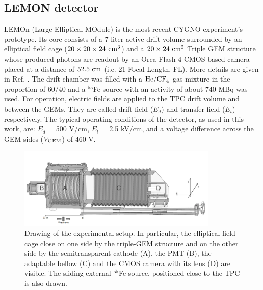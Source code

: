 \documentclass[a4paper,11pt]{article}
\begin{document}
\subsection{LEMON detector}

LEMOn (Large Elliptical MOdule) is the most recent CYGNO experiment's prototype. Its core consists of a 7 liter active drift volume surrounded by an elliptical field cage ($\rm 20 \times 20 \times 24~cm^3$) and a $\rm 20 \times 24~cm^2$ Triple GEM structure whose produced photons are readout by an Orca Flash 4 CMOS-based camera~\cite{ORCAcamera} placed at a distance of $\rm 52.5~cm$ (i.e. 21 Focal Length, FL). 
More details are given in Ref. \cite{bib:fe55, bib:eps, bib:ieee17}.
The drift chamber was filled with a $\rm He/CF_4$ gas mixture in the proportion of $60/40$
and a $^{55}$Fe source with an activity of about 740 MBq was used.
For operation, electric fields are applied to the TPC drift volume and between the GEMs. They are called drift field ($E_d$) and transfer field ($E_t$) respectively.
The typical operating conditions of the detector, as used in this work, are: $E_d$ = 500 V/cm, $E_t$ = 2.5 kV/cm, and a voltage difference across the GEM sides ($ V\rm_{GEM}$) of 460 V.


\begin{figure}[ht]
\centering
\includegraphics[width=0.85\textwidth]{sex_bw3.png}
\caption{Drawing of the experimental setup. In particular, the elliptical field cage close on one side by the triple-GEM structure and on the other side by the semitransparent cathode (A), the PMT (B), the adaptable bellow (C) and the CMOS camera with its lens (D) are visible. The sliding external $^{55}$Fe source, positioned close to the TPC is also drawn.} \label{fig_lemon_1}
\end{figure}
\end{document}
